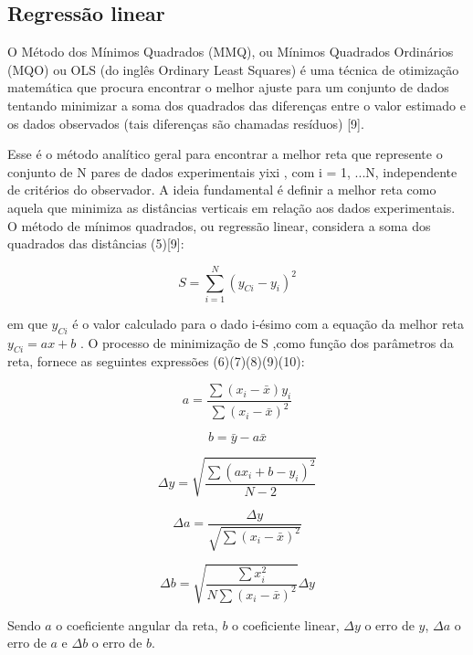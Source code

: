 \documentclass[12pt, letterpaper]{article}
\begin{document}
    \subsection{Regressão linear}
 O Método dos Mínimos Quadrados (MMQ), ou Mínimos Quadrados Ordinários (MQO) ou OLS (do inglês Ordinary Least Squares) é uma técnica de otimização matemática que procura encontrar o melhor ajuste para um conjunto de dados tentando minimizar a soma dos quadrados das diferenças entre o valor estimado e os dados observados (tais diferenças são chamadas resíduos) [9].

Esse é o método analítico geral para encontrar a melhor reta
que represente o conjunto de N pares de dados experimentais
 yixi , com i = 1, ...N, independente de critérios do observador. A
ideia fundamental é definir a melhor reta como aquela que minimiza
as distâncias verticais em relação aos dados experimentais. O
método de mínimos quadrados, ou regressão linear, considera a
soma dos quadrados das distâncias (5)[9]:

\begin{equation}
    S= \sum_{i=1}^{N}(y_{Ci}-y_{i})^{2}
\end{equation}

em que $y_{Ci}$ é o valor calculado para o dado i-ésimo com a equação
da melhor reta $y_{Ci}= ax+b$ . O processo de minimização de S
,como função dos parâmetros da reta, fornece as seguintes
expressões (6)(7)(8)(9)(10):

\begin{equation}
    a= \frac{\sum(x_{i}-\bar x)y_{i} }{\sum(x_{i}-\bar x)^2}
\end{equation}

\begin{equation}
    b = \bar y - a \bar x
\end{equation}

\begin{equation}
    \Delta y = \sqrt{\frac{\sum(ax_{i} +b - y_{i})^2 }{N-2}}
\end{equation}

\begin{equation}
    \Delta a = \frac{\Delta y}{\sqrt{\sum(x_{i}-\bar x)^2}}
\end{equation}

\begin{equation}
    \Delta b = \sqrt{\frac{\sum x_{i}^2 }{N\sum(x_{i}-\bar x)^2}}\Delta y
\end{equation}

    Sendo $a$ o coeficiente angular da reta, $b$ o coeficiente linear, $\Delta y$ o erro de $y$, $\Delta a$ o erro de $a$ e $\Delta b$ o erro de $b$.
\end{document}
